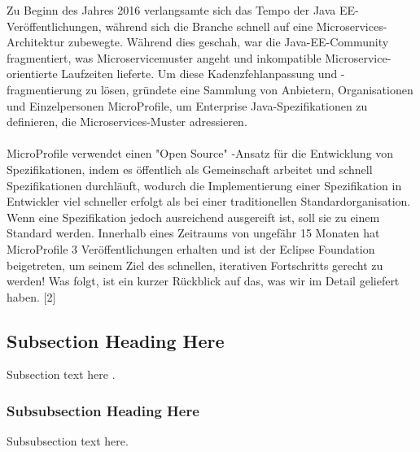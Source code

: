 Zu Beginn des Jahres 2016 verlangsamte sich das Tempo der Java EE-Veröffentlichungen, während sich die Branche schnell auf eine Microservices-Architektur zubewegte. Während dies geschah, war die Java-EE-Community fragmentiert, was Microservicemuster angeht und inkompatible Microservice-orientierte Laufzeiten lieferte. Um diese Kadenzfehlanpassung und -fragmentierung zu lösen, gründete eine Sammlung von Anbietern, Organisationen und Einzelpersonen MicroProfile, um Enterprise Java-Spezifikationen zu definieren, die Microservices-Muster adressieren.\\ \\
MicroProfile verwendet einen "Open Source" -Ansatz für die Entwicklung von Spezifikationen, indem es öffentlich als Gemeinschaft arbeitet und schnell Spezifikationen durchläuft, wodurch die Implementierung einer Spezifikation in Entwickler viel schneller erfolgt als bei einer traditionellen Standardorganisation. Wenn eine Spezifikation jedoch ausreichend ausgereift ist, soll sie zu einem Standard werden.
Innerhalb eines Zeitraums von ungefähr 15 Monaten hat MicroProfile 3 Veröffentlichungen erhalten und ist der Eclipse Foundation beigetreten, um seinem Ziel des schnellen, iterativen Fortschritts gerecht zu werden! Was folgt, ist ein kurzer Rückblick auf das, was wir im Detail geliefert haben. [2]


\subsection{Subsection Heading Here}
Subsection text here \cite{Hsiao.2013}.

\subsubsection{Subsubsection Heading Here}
Subsubsection text here.

